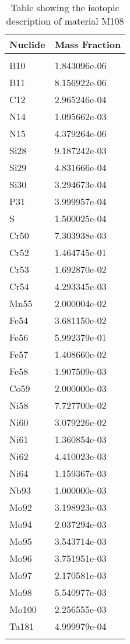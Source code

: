 \begin{centering}
\begin{longtable}[ht!]
\caption{Table showing the isotopic description of material EPPBDY}
\label{table:material_EPPBDY}
\end{longtable}\clearpage

\begin{longtable}[ht!]
{ p{} | p{} }
\hline
Nuclide & Mass Fraction\\
\hline
\\
B10 & 1.843096e-06\\
B11 & 8.156922e-06\\
C12 & 2.965246e-04\\
N14 & 1.095662e-03\\
N15 & 4.379264e-06\\
Si28 & 9.187242e-03\\
Si29 & 4.831666e-04\\
Si30 & 3.294673e-04\\
P31 & 3.999957e-04\\
S & 1.500025e-04\\
Cr50 & 7.303938e-03\\
Cr52 & 1.464745e-01\\
Cr53 & 1.692870e-02\\
Cr54 & 4.293345e-03\\
Mn55 & 2.000004e-02\\
Fe54 & 3.681150e-02\\
Fe56 & 5.992379e-01\\
Fe57 & 1.408660e-02\\
Fe58 & 1.907509e-03\\
Co59 & 2.000000e-03\\
Ni58 & 7.727700e-02\\
Ni60 & 3.079226e-02\\
Ni61 & 1.360854e-03\\
Ni62 & 4.410023e-03\\
Ni64 & 1.159367e-03\\
Nb93 & 1.000000e-03\\
Mo92 & 3.198923e-03\\
Mo94 & 2.037294e-03\\
Mo95 & 3.543714e-03\\
Mo96 & 3.751951e-03\\
Mo97 & 2.170581e-03\\
Mo98 & 5.540977e-03\\
Mo100 & 2.256555e-03\\
Ta181 & 4.999979e-04\\

\caption{Table showing the isotopic description of material M108}
\label{table:material_M108}
\end{longtable}\clearpage


\end{centering}
